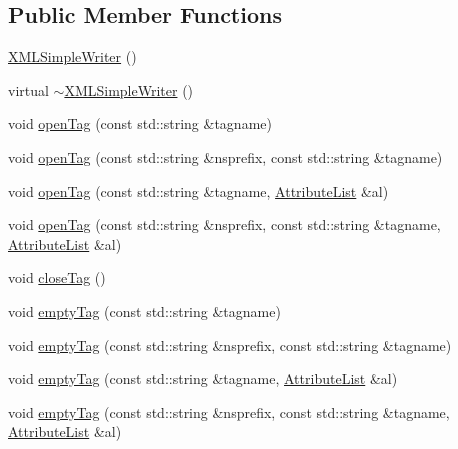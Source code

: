 \subsection*{Public Member Functions}
\begin{DoxyCompactItemize}
\item 
\mbox{\hyperlink{classXMLWriterAPI_1_1XMLSimpleWriter_aa22ad5550ae58f1a9dc9056c4d342d8b}{X\+M\+L\+Simple\+Writer}} ()
\item 
virtual \mbox{\hyperlink{classXMLWriterAPI_1_1XMLSimpleWriter_aa4dd6f9d05c34b7a0d27d1e7e4773f4c}{$\sim$\+X\+M\+L\+Simple\+Writer}} ()
\item 
void \mbox{\hyperlink{classXMLWriterAPI_1_1XMLSimpleWriter_ac3033f799bbe8ba59bfba4f8c22a2e79}{open\+Tag}} (const std\+::string \&tagname)
\item 
void \mbox{\hyperlink{classXMLWriterAPI_1_1XMLSimpleWriter_a8bd5ba895fcb91e18677bd8789ace73a}{open\+Tag}} (const std\+::string \&nsprefix, const std\+::string \&tagname)
\item 
void \mbox{\hyperlink{classXMLWriterAPI_1_1XMLSimpleWriter_ae196789031d10e7157fcdb131452d82a}{open\+Tag}} (const std\+::string \&tagname, \mbox{\hyperlink{namespaceXMLWriterAPI_a28cf3d8051a4ccf0aef208b7ebc66d07}{Attribute\+List}} \&al)
\item 
void \mbox{\hyperlink{classXMLWriterAPI_1_1XMLSimpleWriter_a4a0087e372531dc8c890b8b768419b5f}{open\+Tag}} (const std\+::string \&nsprefix, const std\+::string \&tagname, \mbox{\hyperlink{namespaceXMLWriterAPI_a28cf3d8051a4ccf0aef208b7ebc66d07}{Attribute\+List}} \&al)
\item 
void \mbox{\hyperlink{classXMLWriterAPI_1_1XMLSimpleWriter_a824d840afc871a81114406844810e958}{close\+Tag}} ()
\item 
void \mbox{\hyperlink{classXMLWriterAPI_1_1XMLSimpleWriter_ae40f02c969275fdde51866d8e9271717}{empty\+Tag}} (const std\+::string \&tagname)
\item 
void \mbox{\hyperlink{classXMLWriterAPI_1_1XMLSimpleWriter_a91df124fb76053c30cd8ca1a8dc779e9}{empty\+Tag}} (const std\+::string \&nsprefix, const std\+::string \&tagname)
\item 
void \mbox{\hyperlink{classXMLWriterAPI_1_1XMLSimpleWriter_a935039f24ffc7193782aa99e77c83124}{empty\+Tag}} (const std\+::string \&tagname, \mbox{\hyperlink{namespaceXMLWriterAPI_a28cf3d8051a4ccf0aef208b7ebc66d07}{Attribute\+List}} \&al)
\item 
void \mbox{\hyperlink{classXMLWriterAPI_1_1XMLSimpleWriter_af1ffaaf4a469dfc190be65d4868b0b3d}{empty\+Tag}} (const std\+::string \&nsprefix, const std\+::string \&tagname, \mbox{\hyperlink{namespaceXMLWriterAPI_a28cf3d8051a4ccf0aef208b7ebc66d07}{Attribute\+List}} \&al)

\end{DoxyCompactItemize}
